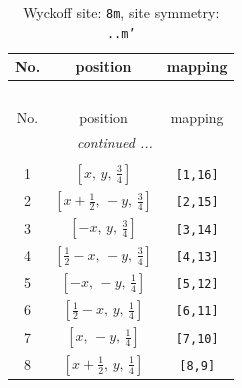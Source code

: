 \documentclass[fleqn,8pt]{jsarticle}
\begin{document}
\begin{longtable}{ccc}
\caption{Wyckoff site: {\tt 8m}, site symmetry: {\tt ..m'}}
 \\
 \hline \hline
No. & position & mapping \\ \hline \endfirsthead

\multicolumn{2}{l}{\tablename\ \thetable{}} \\
 \hline \hline
No. & position & mapping \\ \hline \endhead

 \hline \hline
\multicolumn{2}{r}{\footnotesize\it continued ...} \\ \endfoot

 \hline \hline
\multicolumn{2}{r}{} \\ \endlastfoot

1 & $\left[ x,\, y,\, \frac{3}{4} \right]$ & {\tt [1,16]} \\ \hline
2 & $\left[ x + \frac{1}{2},\, - y,\, \frac{3}{4} \right]$ & {\tt [2,15]} \\ \hline
3 & $\left[ - x,\, y,\, \frac{3}{4} \right]$ & {\tt [3,14]} \\ \hline
4 & $\left[ \frac{1}{2} - x,\, - y,\, \frac{3}{4} \right]$ & {\tt [4,13]} \\ \hline
5 & $\left[ - x,\, - y,\, \frac{1}{4} \right]$ & {\tt [5,12]} \\ \hline
6 & $\left[ \frac{1}{2} - x,\, y,\, \frac{1}{4} \right]$ & {\tt [6,11]} \\ \hline
7 & $\left[ x,\, - y,\, \frac{1}{4} \right]$ & {\tt [7,10]} \\ \hline
8 & $\left[ x + \frac{1}{2},\, y,\, \frac{1}{4} \right]$ & {\tt [8,9]} \\
\end{longtable}
\renewcommand{\arraystretch}{1.2}
\end{document}

